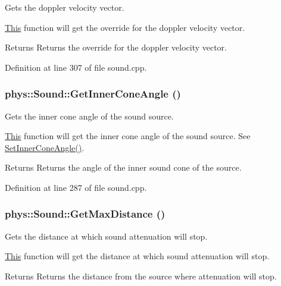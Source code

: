 Gets the doppler velocity vector. 

\hyperlink{structThis}{This} function will get the override for the doppler velocity vector. \begin{DoxyReturn}{Returns}
Returns the override for the doppler velocity vector. 
\end{DoxyReturn}


Definition at line 307 of file sound.cpp.

\hypertarget{classphys_1_1Sound_a5e39752133cd5d8d160455bbbcb360fd}{
\subsubsection[{GetInnerConeAngle}]{ phys::Sound::GetInnerConeAngle ()}}
\label{dc/d2f/classphys_1_1Sound_a5e39752133cd5d8d160455bbbcb360fd}


Gets the inner cone angle of the sound source. 

\hyperlink{structThis}{This} function will get the inner cone angle of the sound source. See \hyperlink{classphys_1_1Sound_ae231936d44db727eb48f9ff259ae0dd6}{SetInnerConeAngle()}. \begin{DoxyReturn}{Returns}
Returns the angle of the inner sound cone of the source. 
\end{DoxyReturn}


Definition at line 287 of file sound.cpp.

\hypertarget{classphys_1_1Sound_a5a9868c589bf85bf1775481e0c8fe4d3}{
\subsubsection[{GetMaxDistance}]{ phys::Sound::GetMaxDistance ()}}
\label{dc/d2f/classphys_1_1Sound_a5a9868c589bf85bf1775481e0c8fe4d3}


Gets the distance at which sound attenuation will stop. 

\hyperlink{structThis}{This} function will get the distance at which sound attenuation will stop. \begin{DoxyReturn}{Returns}
Returns the distance from the source where attenuation will stop. 
\end{DoxyReturn}


